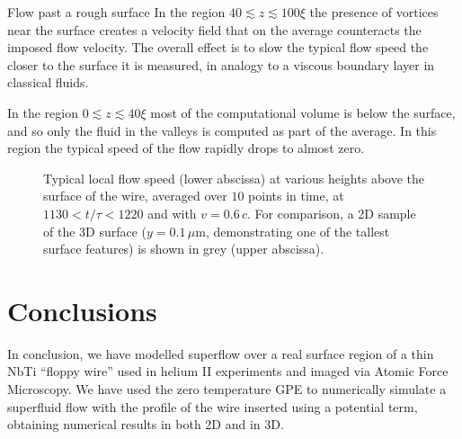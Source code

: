 \begin{chapter}{\label{cha:afm}Flow past a rough surface}
In the region $40 \lesssim z \lesssim 100\xi$ the presence of vortices near the surface creates a velocity field that on the average counteracts the imposed flow velocity. The overall effect is to slow the typical flow speed the closer to the surface it is measured, in analogy to a viscous boundary layer in classical fluids.

In the region $0 \lesssim z \lesssim 40\xi$ most of the computational volume is below the surface, and so only the fluid in the valleys is computed as part of the average. In this region the typical speed of the flow rapidly drops to almost zero.

\begin{figure}
  \centering
  \caption{\label{fig:velprof}Typical local flow speed (lower abscissa) at various heights above the surface of the wire, averaged over $10$ points in time, at $1130<t/\tau<1220$ and with $v=0.6\,c$. For comparison, a 2D sample of the 3D surface ($y=0.1\,\mu$m, demonstrating one of the tallest surface features) is shown in grey (upper abscissa).} 
  \end{figure}

\section{Conclusions}
In conclusion, we have modelled superflow over a real surface region of a thin NbTi ``floppy wire'' used in helium II experiments and imaged via Atomic Force Microscopy. We have used the zero temperature GPE to numerically simulate a superfluid flow with the profile of the wire inserted using a potential term, obtaining numerical results in both 2D and in 3D.


\end{chapter}
